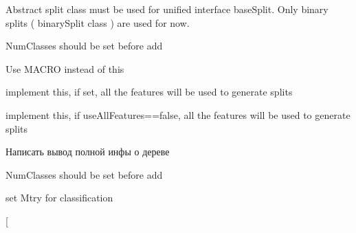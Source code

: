 
\begin{DoxyRefList}
\item[\label{todo__todo000005}%
\hypertarget{todo__todo000005}{}%
Namespace \hyperlink{namespaceffactory}{ffactory} ]Abstract split class must be used for unified interface base\-Split. Only binary splits ( binary\-Split class ) are used for now.  
\item[\label{todo__todo000010}%
\hypertarget{todo__todo000010}{}%
Member \hyperlink{classffactory_1_1_a_r_f_f_file_reader_ac2fe97202f44108f3379a787962c5721}{ffactory\-:\-:A\-R\-F\-F\-File\-Reader\-:\-:read} ()]Num\-Classes should be set before add  
\item[\label{todo__todo000001}%
\hypertarget{todo__todo000001}{}%
Member \hyperlink{classffactory_1_1_base_classifier_ab8f15f99cd827ec7425e6ec0ce5c865d}{ffactory\-:\-:Base\-Classifier\-:\-:predict} (Sample $\ast$sample)]Use M\-A\-C\-R\-O instead of this  
\item[\label{todo__todo000006}%
\hypertarget{todo__todo000006}{}%
Member \hyperlink{classffactory_1_1_base_split_candidate_generator_a7ce11df8208d85d2da2914e41ab3467c}{ffactory\-:\-:Base\-Split\-Candidate\-Generator\-:\-:feature\-Mask} ]implement this, if set, all the features will be used to generate splits  
\item[\label{todo__todo000007}%
\hypertarget{todo__todo000007}{}%
Member \hyperlink{classffactory_1_1_base_split_candidate_generator_a418bcf78922a3d288de0ae3ec55553a6}{ffactory\-:\-:Base\-Split\-Candidate\-Generator\-:\-:num\-Features} ]implement this, if use\-All\-Features==false, all the features will be used to generate splits  
\item[\label{todo__todo000003}%
\hypertarget{todo__todo000003}{}%
Member \hyperlink{classffactory_1_1_base_tree_a21d7faa1c68bb531522a73c36b10a95c}{ffactory\-:\-:Base\-Tree\-:\-:get\-Info} ()]Написать вывод полной инфы о дереве  
\item[\label{todo__todo000011}%
\hypertarget{todo__todo000011}{}%
Member \hyperlink{classffactory_1_1_csv_file_reader_a82882543777400ac3779a89b986a5e98}{ffactory\-:\-:Csv\-File\-Reader\-:\-:read} ()]Num\-Classes should be set before add  
\item[\label{todo__todo000012}%
\hypertarget{todo__todo000012}{}%
Member \hyperlink{classffactory_1_1_extremely_randomized_tree_a866edb4c45c292babb31c4e25b72fc52}{ffactory\-:\-:Extremely\-Randomized\-Tree\-:\-:Extremely\-Randomized\-Tree} ()]set Mtry for classification  
\item[\label{todo__todo000013}%
\hypertarget{todo__todo000013}{}%

\end{DoxyRefList}
